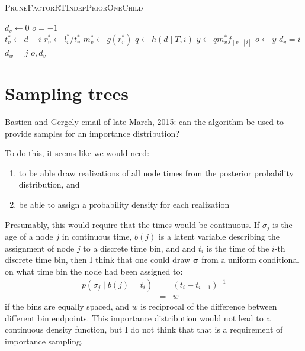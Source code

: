 \documentclass{llncs}
\newcommand{\tree}[0]{\ensuremath{T}\xspace}
\newcommand{\timebin}[0]{\ensuremath{t}\xspace}
\newcommand{\contTime}[1]{\ensuremath{\sigma}_{#1}\xspace}
\newcommand{\contTimeVec}[0]{\ensuremath{\bm{\sigma}}\xspace}
\newcommand{\binFor}[1]{\ensuremath{b({#1})}\xspace}
\newcommand{\subtreeOptFactor}[2]{\ensuremath{f_{[{#1}][{#2}]}}\xspace}
\newcommand{\ratePriorDensity}[0]{\ensuremath{g}\xspace}
\newcommand{\timePriorDensity}[0]{\ensuremath{h}\xspace}
\begin{document}
\begin{algorithm} \caption{\textsc{PruneFactorRTIndepPriorOneChild}}\label{pruneFactorRTIndepOneChild}
\begin{algorithmic}
\STATE $d_v\leftarrow 0$
\STATE $o = -1$ \\
\FOR{$i \in [0, 1, \ldots, d)$ }
    \STATE $t_v^{\ast} \leftarrow d - i$
    \STATE $r_v^{\ast} \leftarrow l_v^{\ast} / t_v^{\ast}$
    \STATE $m_v^{\ast} \leftarrow \ratePriorDensity(r_v^{\ast})$
    \STATE $q \leftarrow \timePriorDensity(d \mid \tree, i)$
    \STATE $y \leftarrow q m_v^{\ast}\subtreeOptFactor{v}{i}$
        \STATE $o \leftarrow y$
        \STATE $d_v = i$
        \STATE $d_w = j$
    \ENDIF
\ENDFOR
\RETURN $o, d_v$
\end{algorithmic}
\end{algorithm}

\newpage




\section{Sampling trees}
Bastien and Gergely email of late March, 2015: can the 
algorithm be used to provide samples for an importance distribution?

To do this, it seems like we would need:
\begin{enumerate}
    \item to be able draw realizations of all node times from the posterior
        probability distribution, and
    \item be able to assign a probability density for each realization
\end{enumerate}

Presumably, this would require that the times would be continuous.
If $\contTime{j}$ is the age of a node $j$ in continuous time,
    $\binFor{j}$ is a latent variable describing the assignment of node
    $j$ to a discrete time bin, and
    and $\timebin_i$ is the time of the $i$-th discrete time bin, then I think that one could
    draw $\contTimeVec$ from a uniform conditional on what time bin the 
    node had been assigned to:
\begin{eqnarray}
    p(\contTime{j} \mid \binFor{j} = \timebin_i) & = & \left(\timebin_{i} - \timebin_{i - 1}\right)^{-1}\\
    & = & w
\end{eqnarray}
if the bins are equally spaced, and $w$ is reciprocal of the
difference between different bin endpoints.
This importance distribution would not lead to a continuous density function, but I do
    not think that that is a requirement of importance sampling.
\end{document}
